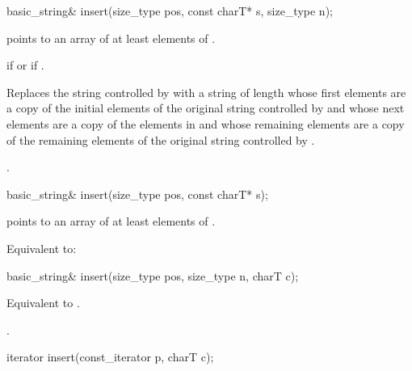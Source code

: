 %
\begin{itemdecl}
basic_string&
  insert(size_type pos, const charT* s, size_type n);
\end{itemdecl}

\begin{itemdescr}
\pnum
\requires {} points to an array of at least 
elements of .

\pnum
\throws {} if  or 
if .

\pnum
\effects Replaces the string controlled by  with a string of
length  whose first  elements are a copy of
the initial elements of the original string controlled by  and
whose next  elements are a copy of the elements in  and
whose remaining elements are a copy of the remaining elements of the original
string controlled by .

\pnum
\returns
{}.
\end{itemdescr}

%
\begin{itemdecl}
basic_string&
  insert(size_type pos, const charT* s);
\end{itemdecl}

\begin{itemdescr}
\pnum
\requires {} points to an array of at least
 elements of .

\pnum
\effects Equivalent to: 
\end{itemdescr}

%
\begin{itemdecl}
basic_string&
  insert(size_type pos, size_type n, charT c);
\end{itemdecl}

\begin{itemdescr}
\pnum
\effects Equivalent to .

\pnum
\returns
{}.
\end{itemdescr}

%
\begin{itemdecl}
iterator insert(const_iterator p, charT c);
\end{itemdecl}

